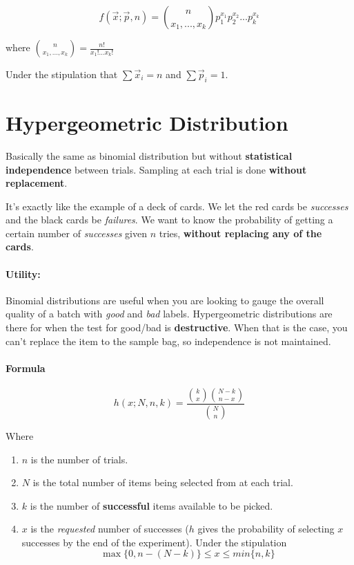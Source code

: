 \documentclass[a4paper,12pt]{report}
\begin{document}
$$f(\vec{x}; \vec{p}, n) = \binom {n}{x_1,...,x_k} p_1^{x_1} p_2^{x_2}...p_k^{x_k}$$

where $\binom {n}{x_1,...,x_k} = \frac{n!}{x_1!...x_k!}$

Under the stipulation that $\sum \vec{x}_i = n$ and $\sum \vec{p}_i = 1$.

\section{Hypergeometric Distribution}

Basically the same as binomial distribution but without \textbf{statistical independence} between trials. Sampling at each trial is done \textbf{without replacement}.

It's exactly like the example of a deck of cards. We let the red cards be \textit{successes} and the black cards be \textit{failures}. We want to know the probability of getting a certain number of \textit{successes} given $n$ tries, \textbf{without replacing any of the cards}. 


\paragraph{Utility: } Binomial distributions are useful when you are looking to gauge the overall quality of a batch with \textit{good} and \textit{bad} labels. Hypergeometric distributions are there for when the test for good/bad is \textbf{destructive}. When that is the case, you can't replace the item to the sample bag, so independence is not maintained. 

\paragraph{Formula} $$h(x; N, n, k) = \frac{\binom{k}{x} \binom{N-k}{n-x}}{\binom{N}{n}}$$

Where 

\begin{enumerate}
\item $n$ is the number of trials.
\item $N$ is the total number of items being selected from at each trial.
\item $k$ is the number of \textbf{successful} items available to be picked.
\item $x$ is the \textit{requested} number of successes ($h$ gives the probability of selecting $x$ successes by the end of the experiment). Under the stipulation
$$\max\{0, n-(N-k)\} \leq x \leq min\{n, k\}$$
\end{enumerate}
\end{document}
